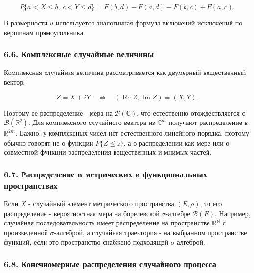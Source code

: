 \documentclass[
  11pt,
  a4paper,
]{article}
\begin{document}
\[
P\{a<X\le b,\ c<Y\le d\}
=
F(b,d)-F(a,d)-F(b,c)+F(a,c).
\]

В размерности \(d\) используется аналогичная формула
включений-исключений по вершинам прямоугольника.

\subsubsection{6.6. Комплексные случайные
величины}\label{ux43aux43eux43cux43fux43bux435ux43aux441ux43dux44bux435-ux441ux43bux443ux447ux430ux439ux43dux44bux435-ux432ux435ux43bux438ux447ux438ux43dux44b}

Комплексная случайная величина рассматривается как двумерный
вещественный вектор:

\[
Z=X+iY
\quad\Longleftrightarrow\quad
(\operatorname{Re}Z,\operatorname{Im}Z)=(X,Y).
\]

Поэтому ее распределение - мера на \(\mathcal B(\mathbb C)\), что
естественно отождествляется с \(\mathcal B(\mathbb R^2)\). Для
комплексного случайного вектора из \(\mathbb C^m\) получают
распределение в \(\mathbb R^{2m}\). Важно: у комплексных чисел нет
естественного линейного порядка, поэтому обычно говорят не о функции
\(P\{Z\le z\}\), а о распределении как мере или о совместной функции
распределения вещественных и мнимых частей.

\subsubsection{6.7. Распределение в метрических и функциональных
пространствах}\label{ux440ux430ux441ux43fux440ux435ux434ux435ux43bux435ux43dux438ux435-ux432-ux43cux435ux442ux440ux438ux447ux435ux441ux43aux438ux445-ux438-ux444ux443ux43dux43aux446ux438ux43eux43dux430ux43bux44cux43dux44bux445-ux43fux440ux43eux441ux442ux440ux430ux43dux441ux442ux432ux430ux445}

Если \(X\) - случайный элемент метрического пространства \((E,\rho)\),
то его распределение - вероятностная мера на борелевской
\(\sigma\)-алгебре \(\mathcal B(E)\). Например, случайная
последовательность имеет распределение на пространстве
\(\mathbb R^{\mathbb N}\) с произведенной \(\sigma\)-алгеброй, а
случайная траектория - на выбранном пространстве функций, если это
пространство снабжено подходящей \(\sigma\)-алгеброй.

\subsubsection{6.8. Конечномерные распределения случайного
процесса}\label{ux43aux43eux43dux435ux447ux43dux43eux43cux435ux440ux43dux44bux435-ux440ux430ux441ux43fux440ux435ux434ux435ux43bux435ux43dux438ux44f-ux441ux43bux443ux447ux430ux439ux43dux43eux433ux43e-ux43fux440ux43eux446ux435ux441ux441ux430}
\end{document}
